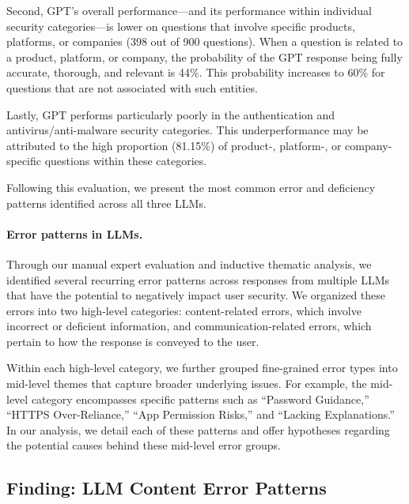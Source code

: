 Second, GPT's overall performance—and its performance within individual security categories—is lower on questions that involve specific products, platforms, or companies (398 out of 900 questions). When a question is related to a product, platform, or company, the probability of the GPT response being fully accurate, thorough, and relevant is 44\%. This probability increases to 60\% for questions that are not associated with such entities.

Lastly, GPT performs particularly poorly in the authentication and antivirus/anti-malware security categories. This underperformance may be attributed to the high proportion (81.15\%) of product-, platform-, or company-specific questions within these categories.

Following this evaluation, we present the most common error and deficiency patterns identified across all three LLMs.  %













\paragraph{Error patterns in LLMs.} Through our manual expert evaluation and inductive thematic analysis, we identified several recurring error patterns across responses from multiple LLMs that have the potential to negatively impact user security. We organized these errors into two high-level categories: content-related errors, which involve incorrect or deficient information, and communication-related errors, which pertain to how the response is conveyed to the user.

Within each high-level category, we further grouped fine-grained error types into mid-level themes that capture broader underlying issues. For example, the mid-level category \textit{\LackAdherenceResearch} encompasses specific patterns such as “Password Guidance,” “HTTPS Over-Reliance,” “App Permission Risks,” and “Lacking Explanations.” In our analysis, we detail each of these patterns and offer hypotheses regarding the potential causes behind these mid-level error groups.

\subsection{Finding: LLM Content Error Patterns}
\label{sec:content_errors}





